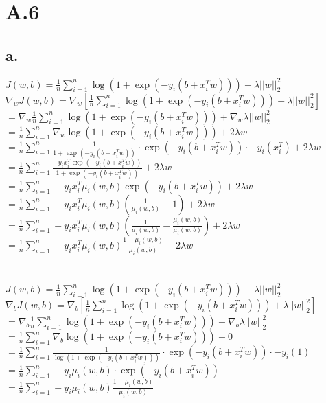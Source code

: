\documentclass{article}
\newcommand{\1}{\mathbf{1}}
\begin{document}
\section*{A.6}
{\Large 

\subsection*{a.}

$J(w,b) = \frac{1}{n} \sum_{i=1}^n \log( 1 + \exp(-y_i (b + x_i^T w))) + \lambda ||w||_2^2$ \\
$\nabla_w J(w,b) = \nabla_w [\frac{1}{n} \sum_{i=1}^n \log( 1 + \exp(-y_i (b + x_i^T w))) + \lambda ||w||_2^2]$ \\ 
$ = \nabla_w \frac{1}{n} \sum_{i=1}^n \log( 1 + \exp(-y_i (b + x_i^T w))) + \nabla_w \lambda ||w||_2^2$ \\ 
$ = \frac{1}{n} \sum_{i=1}^n \nabla_w \log( 1 + \exp(-y_i (b + x_i^T w))) + 2 \lambda w$ \\ 
$ = \frac{1}{n} \sum_{i=1}^n \frac{1}{1 + \exp(-y_i (b + x_i^T w))} \cdot \exp(-y_i (b + x_i^T w)) \cdot -y_i (x_i^T) + 2 \lambda w$ \\ 
$ = \frac{1}{n} \sum_{i=1}^n \frac{-y_i x_i^T \exp(-y_i (b + x_i^T w))}{1 + \exp(-y_i (b + x_i^T w))} + 2 \lambda w$ \\ 
$ = \frac{1}{n} \sum_{i=1}^n -y_i x_i^T \mu_i(w, b) \exp(-y_i (b + x_i^T w)) + 2 \lambda w$ \\ 
$ = \frac{1}{n} \sum_{i=1}^n -y_i x_i^T \mu_i(w, b) (\frac{1}{\mu_i(w, b)} - 1) + 2 \lambda w$ \\ 
$ = \frac{1}{n} \sum_{i=1}^n -y_i x_i^T \mu_i(w, b) (\frac{1}{\mu_i(w, b)} - \frac{\mu_i(w, b)}{\mu_i(w, b)}) + 2 \lambda w$ \\ 
$ = \frac{1}{n} \sum_{i=1}^n -y_i x_i^T \mu_i(w, b) \frac{1 - \mu_i(w, b)}{\mu_i(w, b)} + 2 \lambda w$ \\ 
 \\ \\
$J(w,b) = \frac{1}{n} \sum_{i=1}^n \log( 1 + \exp(-y_i (b + x_i^T w))) + \lambda ||w||_2^2$ \\
$\nabla_{b} J(w,b) = \nabla_{b} [\frac{1}{n} \sum_{i=1}^n \log( 1 + \exp(-y_i (b + x_i^T w))) + \lambda ||w||_2^2]$ \\
$ = \nabla_{b} \frac{1}{n} \sum_{i=1}^n \log( 1 + \exp(-y_i (b + x_i^T w))) + \nabla_{b} \lambda ||w||_2^2$ \\ 
$ = \frac{1}{n} \sum_{i=1}^n \nabla_{b} \log( 1 + \exp(-y_i (b + x_i^T w))) + 0$ \\ 
$ = \frac{1}{n} \sum_{i=1}^n \frac{1}{\log( 1 + \exp(-y_i (b + x_i^T w)))} \cdot \exp(-y_i (b + x_i^T w)) \cdot -y_i(1)$ \\ 
$ = \frac{1}{n} \sum_{i=1}^n -y_i \mu_i(w, b) \cdot \exp(-y_i (b + x_i^T w))$ \\ 
$ = \frac{1}{n} \sum_{i=1}^n -y_i \mu_i(w, b) \frac{1 - \mu_i(w, b)}{\mu_i(w, b)}$ \\ 

}
\end{document}
